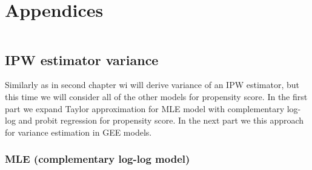 \documentclass[
  letterpaper,
  DIV=11,
  numbers=noendperiod]{scrreprt}
\begin{document}
\chapter{Appendices}\label{appendices-1}

\[
\newcommand{\bSigma}{\boldsymbol{\Sigma}}
\newcommand{\bOmega}{\boldsymbol{\Omega}}
\newcommand{\bTheta}{\boldsymbol{\Theta}}
\newcommand{\bPi}{\boldsymbol{\Pi}}
\newcommand{\bbeta}{\boldsymbol{\beta}}
\newcommand{\balpha}{\boldsymbol{\alpha}}
\newcommand{\brho}{\boldsymbol{\rho}}
\newcommand{\beps}{\boldsymbol{\epsilon}}
\newcommand{\blambda}{\boldsymbol{\lambda}}
\newcommand{\bgamma}{\boldsymbol{\gamma}}
\newcommand{\btheta}{\boldsymbol{\theta}}
\newcommand{\bmu}{\boldsymbol{\mu}}
\newcommand{\bpi}{\boldsymbol{\pi}}
\newcommand{\bphi}{\boldsymbol{\phi}}
\newcommand{\bPhi}{\boldsymbol{\Phi}}
\newcommand{\boldeta}{\boldsymbol{\eta}}
\newcommand{\bx}{\boldsymbol{x}}
\newcommand{\bD}{\boldsymbol{D}}
\newcommand{\bV}{\boldsymbol{V}}
\newcommand{\bv}{\boldsymbol{v}}
\newcommand{\bY}{\boldsymbol{Y}}
\newcommand{\bA}{\boldsymbol{A}}
\newcommand{\bB}{\boldsymbol{B}}
\newcommand{\bR}{\boldsymbol{R}}
\newcommand{\bM}{\boldsymbol{M}}
\newcommand{\bI}{\boldsymbol{I}}
\newcommand{\bC}{\boldsymbol{C}}
\newcommand{\bW}{\boldsymbol{W}}
\newcommand{\bw}{\boldsymbol{w}}
\newcommand{\bd}{\boldsymbol{d}}
\newcommand{\bT}{\boldsymbol{T}}
\newcommand{\bt}{\boldsymbol{t}}
\newcommand{\bZ}{\boldsymbol{Z}}
\newcommand{\bX}{\boldsymbol{X}}
\newcommand{\bz}{\boldsymbol{z}}
\newcommand{\by}{\boldsymbol{y}}
\newcommand{\br}{\boldsymbol{r}}
\newcommand{\bp}{\boldsymbol{p}}
\newcommand{\bb}{\boldsymbol{b}}
\newcommand{\bZero}{\boldsymbol{0}}
\newcommand{\bOne}{\boldsymbol{1}}
\]

\section{IPW estimator variance}\label{ipw-estimator-variance}

Similarly as in second chapter wi will derive variance of an IPW
estimator, but this time we will consider all of the other models for
propensity score. In the first part we expand Taylor approximation for
MLE model with complementary log-log and probit regression for
propensity score. In the next part we this approach for variance
estimation in GEE models.

\subsection{MLE (complementary log-log
model)}\label{mle-complementary-log-log-model}
\end{document}
